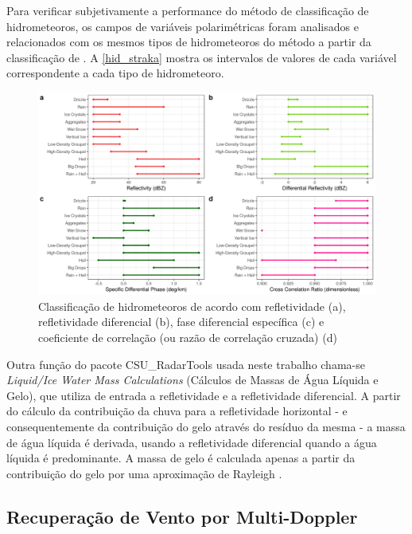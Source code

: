 Para verificar subjetivamente a performance do método de classificação de hidrometeoros, os campos de variáveis polarimétricas foram analisados e relacionados com os mesmos tipos de hidrometeoros do método a partir da classificação de . A \autoref{hid_straka} mostra os intervalos de valores de cada variável correspondente a cada tipo de hidrometeoro.

\begin{figure}[htb]
	\begin{center}
		\caption{Classificação de hidrometeoros de acordo com refletividade (a), refletividade diferencial (b), fase diferencial específica (c) e coeficiente de correlação (ou razão de correlação cruzada) (d)} 
		\label{hid_straka}
		\includegraphics[width=\columnwidth]{../General_Processing/figures/hids_strakaetal.png}
	\end{center}
\end{figure}

Outra função do pacote CSU\_RadarTools usada neste trabalho chama-se \textit{Liquid/Ice Water Mass Calculations} (Cálculos de Massas de Água Líquida e Gelo), que utiliza de entrada a refletividade e a refletividade diferencial. A partir do cálculo da contribuição da chuva para a refletividade horizontal - e consequentemente da contribuição do gelo através do resíduo da mesma - a massa de água líquida é derivada, usando a refletividade diferencial quando a água líquida é predominante. A massa de gelo é calculada apenas a partir da contribuição do gelo por uma aproximação de Rayleigh \cite{Carey2000, Cifelli2002b}.

\subsection{Recuperação de Vento por Multi-Doppler}\label{multidoppler}

